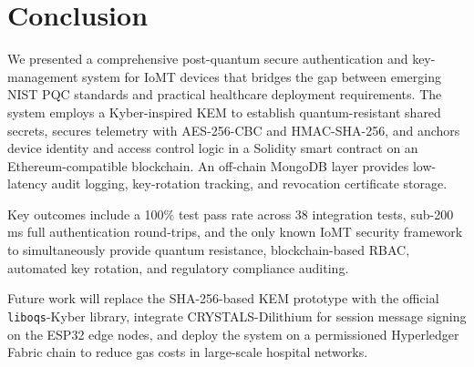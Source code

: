 \documentclass[conference]{IEEEtran}
\begin{document}
\section{Conclusion}
\label{sec:conclusion}

We presented a comprehensive post-quantum secure authentication and key-management
system for IoMT devices that bridges the gap between emerging NIST PQC standards and
practical healthcare deployment requirements. The system employs a Kyber-inspired KEM
to establish quantum-resistant shared secrets, secures telemetry with AES-256-CBC and
HMAC-SHA-256, and anchors device identity and access control logic in a Solidity smart
contract on an Ethereum-compatible blockchain. An off-chain MongoDB layer provides
low-latency audit logging, key-rotation tracking, and revocation certificate storage.

Key outcomes include a 100\% test pass rate across 38 integration tests, sub-200\,ms
full authentication round-trips, and the only known IoMT security framework to
simultaneously provide quantum resistance, blockchain-based RBAC, automated key
rotation, and regulatory compliance auditing.

Future work will replace the SHA-256-based KEM prototype with the official
\texttt{liboqs}-Kyber library, integrate CRYSTALS-Dilithium for session message signing
on the ESP32 edge nodes, and deploy the system on a permissioned Hyperledger Fabric
chain to reduce gas costs in large-scale hospital networks.



\end{document}
